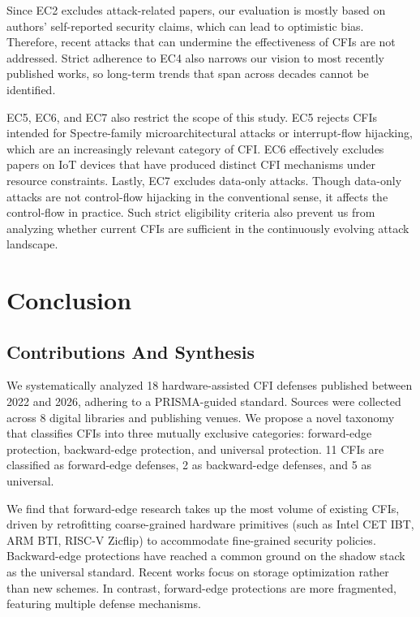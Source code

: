 \documentclass[journal,onecolumn]{IEEEtran}
\begin{document}
Since EC2 excludes attack-related papers, our evaluation is mostly based on authors' self-reported security claims, which can lead to optimistic bias. Therefore, recent attacks that can undermine the effectiveness of CFIs are not addressed. Strict adherence to EC4 also narrows our vision to most recently published works, so long-term trends that span across decades cannot be identified.

EC5, EC6, and EC7 also restrict the scope of this study. EC5 rejects CFIs intended for Spectre-family microarchitectural attacks or interrupt-flow hijacking, which are an increasingly relevant category of CFI. EC6 effectively excludes papers on IoT devices that have produced distinct CFI mechanisms under resource constraints. Lastly, EC7 excludes data-only attacks. Though data-only attacks are not control-flow hijacking in the conventional sense, it affects the control-flow in practice. Such strict eligibility criteria also prevent us from analyzing whether current CFIs are sufficient in the continuously evolving attack landscape.

\section{Conclusion}

\subsection{Contributions And Synthesis} \label{sec:conclusion}

We systematically analyzed 18 hardware-assisted CFI defenses published between 2022 and 2026, adhering to a PRISMA-guided standard. Sources were collected across 8 digital libraries and publishing venues. We propose a novel taxonomy that classifies CFIs into three mutually exclusive categories: forward-edge protection, backward-edge protection, and universal protection. 11 CFIs are classified as forward-edge defenses, 2 as backward-edge defenses, and 5 as universal.

We find that forward-edge research takes up the most volume of existing CFIs, driven by retrofitting coarse-grained hardware primitives (such as Intel CET IBT, ARM BTI, RISC-V Zicflip) to accommodate fine-grained security policies. Backward-edge protections have reached a common ground on the shadow stack as the universal standard. Recent works focus on storage optimization rather than new schemes. In contrast, forward-edge protections are more fragmented, featuring multiple defense mechanisms.
\end{document}
